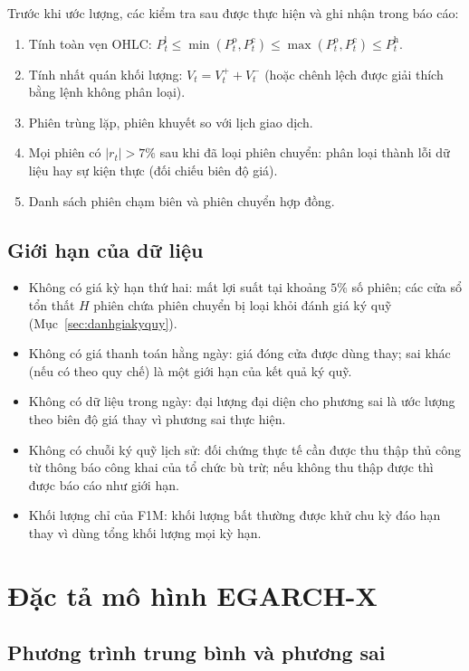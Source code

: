 \documentclass[12pt,a4paper]{article}
\theoremstyle{definition}
\theoremstyle{remark}
\begin{document}
Trước khi ước lượng, các kiểm tra sau được thực hiện và ghi nhận trong báo cáo:
\begin{enumerate}
\item Tính toàn vẹn OHLC: $P^{\mathrm l}_t\le\min(P^{\mathrm o}_t,P^{\mathrm c}_t)\le\max(P^{\mathrm o}_t,P^{\mathrm c}_t)\le P^{\mathrm h}_t$.
\item Tính nhất quán khối lượng: $V_t=V^{+}_t+V^{-}_t$ (hoặc chênh lệch được giải thích bằng lệnh không phân loại).
\item Phiên trùng lặp, phiên khuyết so với lịch giao dịch.
\item Mọi phiên có $|r_t|>7\%$ sau khi đã loại phiên chuyển: phân loại thành lỗi dữ liệu hay sự kiện thực (đối chiếu biên độ giá).
\item Danh sách phiên chạm biên và phiên chuyển hợp đồng.
\end{enumerate}

\subsection{Giới hạn của dữ liệu}\label{sec:hanchedulieu}

\begin{itemize}
\item Không có giá kỳ hạn thứ hai: mất lợi suất tại khoảng $5\%$ số phiên; các cửa sổ tổn thất $H$ phiên chứa phiên chuyển bị loại khỏi đánh giá ký quỹ (Mục~\ref{sec:danhgiakyquy}).
\item Không có giá thanh toán hằng ngày: giá đóng cửa được dùng thay; sai khác (nếu có theo quy chế) là một giới hạn của kết quả ký quỹ.
\item Không có dữ liệu trong ngày: đại lượng đại diện cho phương sai là ước lượng theo biên độ giá thay vì phương sai thực hiện.
\item Không có chuỗi ký quỹ lịch sử: đối chứng thực tế cần được thu thập thủ công từ thông báo công khai của tổ chức bù trừ; nếu không thu thập được thì được báo cáo như giới hạn.
\item Khối lượng chỉ của F1M: khối lượng bất thường được khử chu kỳ đáo hạn thay vì dùng tổng khối lượng mọi kỳ hạn.
\end{itemize}

\section{Đặc tả mô hình EGARCH-X}\label{sec:mohinh}

\subsection{Phương trình trung bình và phương sai}
\end{document}
